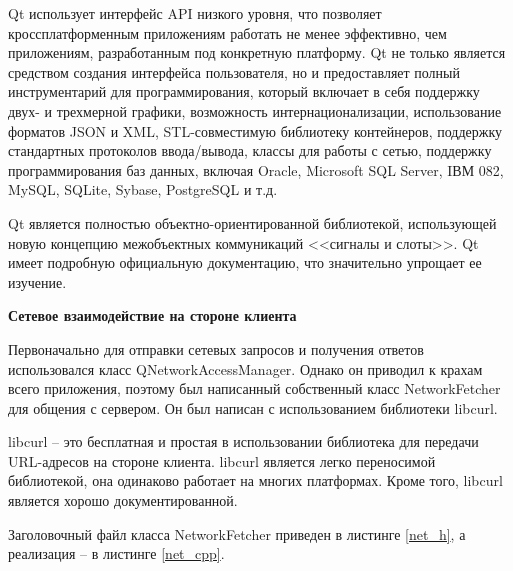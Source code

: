 \documentclass[a4paper,14pt]{article}
\begin{document}
Qt использует интерфейс API низкого уровня, что позволяет кроссплатформенным приложениям работать не менее эффективно, чем приложениям, разработанным под конкретную платформу. Qt не только является средством создания интерфейса пользователя, но и предоставляет полный инструментарий для программирования, который включает в себя поддержку двух- и трехмерной графики, возможность интернационализации, использование форматов JSON и XML,  STL-совместимую библиотеку контейнеров, поддержку стандартных протоколов ввода/вывода, классы для работы с сетью, поддержку программирования баз данных, включая Oracle, Microsoft SQL Server, IВМ 082, MySQL, SQLite, Sybase, PostgreSQL и т.д. 

Qt является полностью объектно-ориентированной библиотекой, использующей новую концепцию межобъектных коммуникаций <<сигналы и слоты>>. Qt имеет подробную официальную документацию, что значительно упрощает ее изучение.

\textbf{Сетевое взаимодействие на стороне клиента}

Первоначально для отправки сетевых запросов и получения ответов использовался класс QNetworkAccessManager. Однако он приводил к крахам всего приложения, поэтому был написанный собственный класс NetworkFetcher для общения с сервером. Он был написан с использованием библиотеки libcurl. 

libcurl -- это бесплатная и простая в использовании библиотека для передачи URL-адресов на стороне клиента. libcurl является легко переносимой библиотекой, она одинаково работает на многих платформах. Кроме того, libcurl является хорошо документированной.

Заголовочный файл класса NetworkFetcher приведен в листинге \ref{net_h}, а реализация -- в листинге \ref{net_cpp}.
\end{document}
